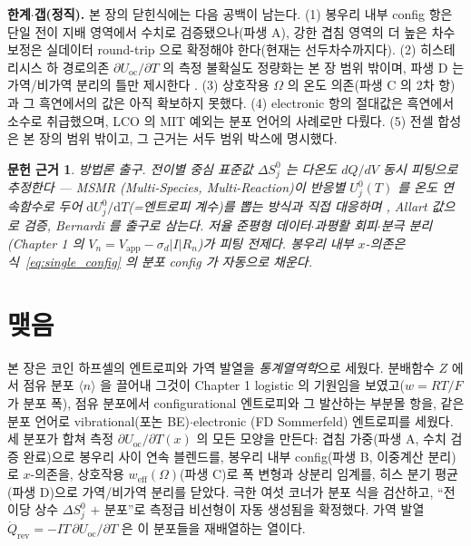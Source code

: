 \documentclass[11pt,a4paper]{article}
\newtheorem*{srcbox}{문헌 근거}
\newcommand{\dd}{\mathrm{d}}
\newcommand{\rev}{\mathrm{rev}}
\newcommand{\oc}{\mathrm{oc}}
\newcommand{\eff}{\mathrm{eff}}
\newcommand{\avg}[1]{\langle #1\rangle}
\begin{document}
\textbf{한계$\cdot$갭(정직).} 본 장의 닫힌식에는 다음 공백이 남는다. (1) 봉우리 내부 config 항은 단일 전이
지배 영역에서 수치로 검증됐으나(파생 A), 강한 겹침 영역의 더 높은 차수 보정은 실데이터 round-trip 으로
확정해야 한다(현재는 선두차수까지다). (2) 히스테리시스 하 경로의존 $\partial U_\oc/\partial T$ 의 측정 불확실도
정량화는 본 장 범위 밖이며, 파생 D 는 가역/비가역 분리의 틀만 제시한다 \cite{hysteresis2018}. (3) 상호작용
$\Omega$ 의 온도 의존(파생 C 의 2차 항)과 그 흑연에서의 값은 아직 확보하지 못했다. (4) electronic 항의 절대값은
흑연에서 소수로 취급했으며, LCO 의 MIT 예외는 분포 언어의 사례로만 다뤘다. (5) 전셀 합성은 본 장의 범위
밖이고, 그 근거는 서두 범위 박스에 명시했다.

\begin{srcbox}
방법론 출구. 전이별 중심 표준값 $\Delta S^0_j$ 는 다온도 $dQ/dV$ 동시 피팅으로 추정한다 — MSMR
(Multi-Species, Multi-Reaction)이 반응별 $U_j^0(T)$ 를 온도 연속함수로 두어 $\dd U_j^0/\dd T$(=엔트로피
계수)를 뽑는 방식과 직접 대응하며 \cite{msmr_partI,msmr_partII}, Allart 값으로 검증, Bernardi 를 출구로 삼는다.
저율 준평형 데이터$\cdot$과평활 회피$\cdot$분극 분리(Chapter 1 의 $V_n=V_\mathrm{app}-\sigma_d|I|R_n$)가 피팅
전제다. 봉우리 내부 $x$-의존은 식~\eqref{eq:single_config} 의 분포 config 가 자동으로 채운다.
\end{srcbox}

\section*{맺음}
본 장은 코인 하프셀의 엔트로피와 가역 발열을 \emph{통계열역학}으로 세웠다. 분배함수 $Z$ 에서 점유 분포
$\avg{n}$ 을 끌어내 그것이 Chapter 1 logistic 의 기원임을 보였고($w=RT/F$ 가 분포 폭), 점유 분포에서
configurational 엔트로피와 그 발산하는 부분몰 항을, 같은 분포 언어로 vibrational(포논 BE)$\cdot$electronic
(FD Sommerfeld) 엔트로피를 세웠다. 세 분포가 합쳐 측정 $\partial U_\oc/\partial T(x)$ 의 모든 모양을 만든다:
겹침 가중(파생 A, 수치 검증 완료)으로 봉우리 사이 연속 블렌드를, 봉우리 내부 config(파생 B, 이중계산 분리)로
$x$-의존을, 상호작용 $w_\eff(\Omega)$(파생 C)로 폭 변형과 상분리 임계를, 히스 분기 평균(파생 D)으로 가역/비가역
분리를 닫았다. 극한 여섯 코너가 분포 식을 검산하고, ``전이당 상수 $\Delta S^0_j$ $+$ 분포''로 측정급 비선형이
자동 생성됨을 확정했다. 가역 발열 $\dot Q_\rev=-IT\,\partial U_\oc/\partial T$ 은 이 분포들을 재배열하는 열이다.
\end{document}
